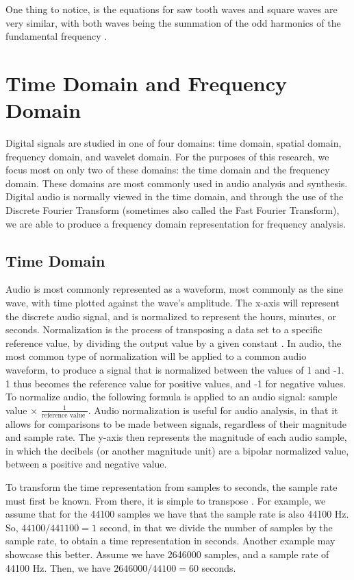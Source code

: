 One thing to notice, is the equations for saw tooth waves and square waves are very similar, with both waves being the summation of the odd harmonics of the fundamental frequency \cite{Tarr_2019}.

\section{Time Domain and Frequency Domain}

Digital signals are studied in one of four domains: time domain, spatial domain, frequency domain, and wavelet domain. For the purposes of this research, we focus most on only two of these domains: the time domain and the frequency domain. These domains are most commonly used in audio analysis and synthesis. Digital audio is normally viewed in the time domain, and through the use of the Discrete Fourier Transform (sometimes also called the Fast Fourier Transform), we are able to produce a frequency domain representation for frequency analysis.

\subsection{Time Domain}

Audio is most commonly represented as a waveform, most commonly as the sine wave, with time plotted against the wave's amplitude. The x-axis will represent the discrete audio signal, and is normalized to represent the hours, minutes, or seconds. Normalization is the process of transposing a data set to a specific reference value, by dividing the output value by a given constant \cite{Zjalic_2021}. In audio, the most common type of normalization will be applied to a common audio waveform, to produce a signal that is normalized between the values of 1 and -1. 1 thus becomes the reference value for positive values, and -1 for negative values. To normalize audio, the following formula is applied to an audio signal: sample value $\times$ $\frac{1}{\textrm{reference value }}$. Audio normalization is useful for audio analysis, in that it allows for comparisons to be made between signals, regardless of their magnitude and sample rate. The y-axis then represents the magnitude of each audio sample, in which the decibels (or another magnitude unit) are a bipolar normalized value, between a positive and negative value. 

To transform the time representation from samples to seconds, the sample rate must first be known. From there, it is simple to transpose \cite{Zjalic_2021}. For example, we assume that for the 44100 samples we have that the sample rate is also 44100 Hz. So, $44100 / 441100 = 1$ second, in that we divide the number of samples by the sample rate, to obtain a time representation in seconds. Another example may showcase this better. Assume we have 2646000 samples, and a sample rate of 44100 Hz. Then, we have $2646000/44100 = 60$ seconds.

